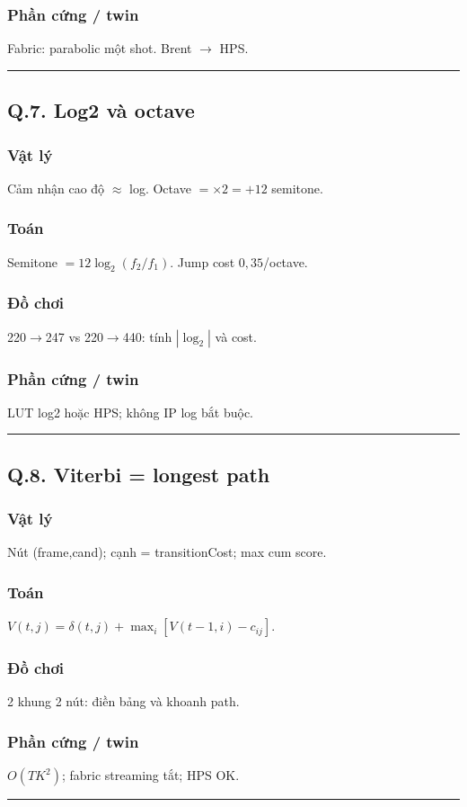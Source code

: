 \subsubsection*{Phần cứng / twin}
Fabric: parabolic một shot. Brent $\to$ HPS.
\vspace{0.25cm}\hrule\vspace{0.25cm}
\subsection*{Q.7. Log2 và octave}
\subsubsection*{Vật lý}
Cảm nhận cao độ $\approx$ log. Octave $=\times2=+12$ semitone.
\subsubsection*{Toán}
Semitone $=12\log_2(f_2/f_1)$. Jump cost $0{,}35$/octave.
\subsubsection*{Đồ chơi}
220$\to$247 vs 220$\to$440: tính $|\log_2|$ và cost.
\subsubsection*{Phần cứng / twin}
LUT log2 hoặc HPS; không IP log bắt buộc.
\vspace{0.25cm}\hrule\vspace{0.25cm}
\subsection*{Q.8. Viterbi = longest path}
\subsubsection*{Vật lý}
Nút (frame,cand); cạnh = transitionCost; max cum score.
\subsubsection*{Toán}
$V(t,j)=\delta(t,j)+\max_i[V(t-1,i)-c_{ij}]$.
\subsubsection*{Đồ chơi}
2 khung 2 nút: điền bảng và khoanh path.
\subsubsection*{Phần cứng / twin}
$O(TK^2)$; fabric streaming tắt; HPS OK.
\vspace{0.25cm}\hrule\vspace{0.25cm}
